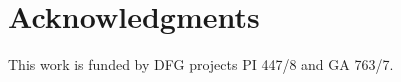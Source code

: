 \documentclass[letter, 10pt, conference]{IEEEtran}
\begin{document}
\maketitle

%





\vspace{-3pt}

\vspace{-3pt}

\section*{Acknowledgments}
\vspace{-3pt}
\noindent This work is funded by DFG projects PI 447/8 and GA 763/7.
\vspace{-4pt}




%
\end{document}

